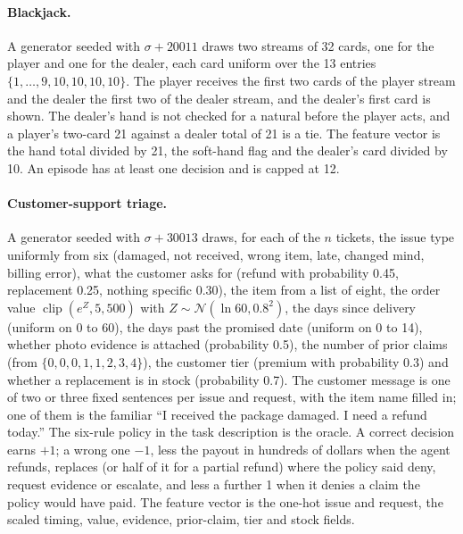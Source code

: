 \paragraph{Blackjack.}
A generator seeded with $\sigma+20011$ draws two streams of 32 cards, one for the player and one for the dealer, each card uniform over the 13 entries $\{1,\dots,9,10,10,10,10\}$. The player receives the first two cards of the player stream and the dealer the first two of the dealer stream, and the dealer's first card is shown. The dealer's hand is not checked for a natural before the player acts, and a player's two-card 21 against a dealer total of 21 is a tie. The feature vector is the hand total divided by 21, the soft-hand flag and the dealer's card divided by 10. An episode has at least one decision and is capped at 12.

\paragraph{Customer-support triage.}
A generator seeded with $\sigma+30013$ draws, for each of the $n$ tickets, the issue type uniformly from six (damaged, not received, wrong item, late, changed mind, billing error), what the customer asks for (refund with probability 0.45, replacement 0.25, nothing specific 0.30), the item from a list of eight, the order value $\operatorname{clip}(e^{Z},5,500)$ with $Z\sim\mathcal{N}(\ln 60,0.8^2)$, the days since delivery (uniform on 0 to 60), the days past the promised date (uniform on 0 to 14), whether photo evidence is attached (probability 0.5), the number of prior claims (from $\{0,0,0,1,1,2,3,4\}$), the customer tier (premium with probability 0.3) and whether a replacement is in stock (probability 0.7). The customer message is one of two or three fixed sentences per issue and request, with the item name filled in; one of them is the familiar ``I received the package damaged. I need a refund today.'' The six-rule policy in the task description is the oracle. A correct decision earns $+1$; a wrong one $-1$, less the payout in hundreds of dollars when the agent refunds, replaces (or half of it for a partial refund) where the policy said deny, request evidence or escalate, and less a further 1 when it denies a claim the policy would have paid. The feature vector is the one-hot issue and request, the scaled timing, value, evidence, prior-claim, tier and stock fields.


